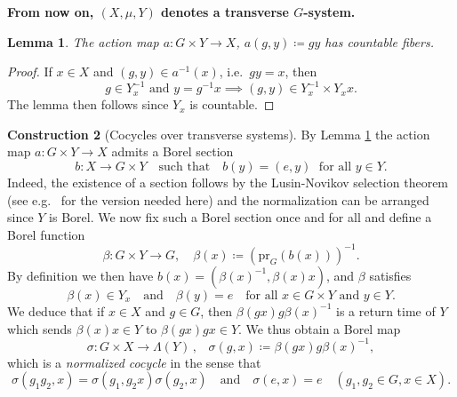 \documentclass[11pt, oneside]{amsart}
\newtheorem{lemma}{Lemma}[section]
\theoremstyle{definition}
\newtheorem{con}[lemma]{Construction}
\theoremstyle{remark}
\theoremstyle{TheoremNum}
\newcommand{\qand}{\quad \text{and} \quad}
\begin{document}
\textbf{From now on, $(X, \mu, Y)$ denotes a transverse $G$-system.}
\begin{lemma}\label{CountFib1} The action map $a:G\times Y\to X$, $a(g,y) \coloneqq gy$ has countable fibers.
\end{lemma}
\begin{proof} If $x \in X$ and $(g,y) \in  a^{-1}(x)$, i.e.\ $g y = x$, then
\[
g \in Y_x^{-1} \text{ and }y = g^{-1}  x \implies (g,y) \in  Y_x^{-1} \times Y_x  x.
\]
The lemma then follows since $Y_x$ is countable.
\end{proof}


\begin{con}[Cocycles over transverse systems]\label{ConCocycle} 
By Lemma \ref{CountFib1} the action map $a: G \times Y \to X$ admits a Borel section
\begin{equation}\label{bfix}
b:X \to G\times Y \quad \text{such that} \quad b(y) = (e,y) \; \text{ for all }y \in Y.
\end{equation}
Indeed, the existence of a section follows by the Lusin-Novikov selection theorem (see e.g.\ \cite[Lemma 2.1]{BHK} for the version needed here) and the normalization can be arranged since $Y$ is Borel.
We now fix such a Borel section once and for all and define a Borel function
\[
\beta: G \times Y \to G, \quad \beta(x) \coloneqq  (\mathrm{pr}_G (b(x)))^{-1}.
\]
By definition we then have $b(x) = (\beta(x)^{-1}, \beta(x)x)$, and $\beta$ satisfies
\begin{equation}\label{BetaNormalization}
\beta(x) \in Y_x \qand \beta(y) = e \quad \text{for all }x \in  G \times Y \text{ and }y \in Y.
\end{equation}
We deduce that if $x \in X$ and $g \in G$, then $\beta(gx)g\beta(x)^{-1}$ is a return time of $Y$ which 
sends $\beta(x)  x \in Y$ to $\beta(g x)  g x \in Y$. We thus obtain a Borel map
 \[ 
    \sigma:G\times X\to \Lambda(Y)\,,\;\;\; \sigma(g,x)\coloneqq \beta(g x)g\beta(x)^{-1},
\]
which is a \emph{normalized cocycle} in the sense that
\begin{equation}\label{CocycleId}
\sigma(g_1g_2, x) = \sigma(g_1, g_2  x)\sigma(g_2, x) \quad \text{and} \quad \sigma(e,x) = e \quad (g_1, g_2 \in G, x \in X).
\end{equation}
\begin{center}
  \begin{figure}[!ht]
\end{figure}
\end{center}
\end{con}
\end{document}
